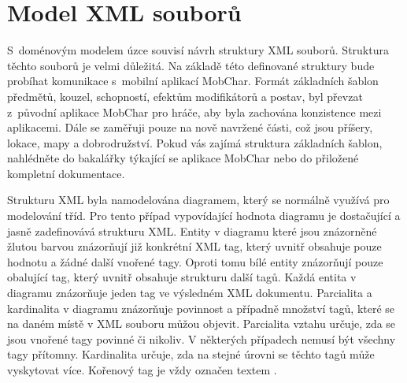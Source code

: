 \documentclass[thesis=B,czech]{resources/FITthesis}[2012/06/26]
\begin{document}
	\section{Model XML souborů}
S~doménovým modelem úzce souvisí návrh struktury XML souborů. Struktura těchto souborů je velmi důležitá. Na základě této definované struktury bude probíhat komunikace s~mobilní aplikací MobChar. Formát základních šablon předmětů, kouzel, schopností, efektům modifikátorů a postav, byl převzat z~původní aplikace MobChar pro hráče, aby byla zachována konzistence mezi aplikacemi. Dále se zaměřuji pouze na nově navržené části, což jsou příšery, lokace, mapy a dobrodružství. Pokud vás zajímá struktura základních šablon, nahlédněte do bakalářky týkající se aplikace MobChar\cite{Weberova_2017} nebo do přiložené kompletní dokumentace.\par

Strukturu XML byla namodelována diagramem, který se normálně využívá pro modelování tříd. Pro tento případ vypovídající hodnota diagramu je dostačující a jasně zadefinovává strukturu XML. Entity v diagramu které jsou znázorněné žlutou barvou znázorňují již konkrétní XML tag, který uvnitř obsahuje pouze hodnotu a žádné další vnořené tagy. Oproti tomu bílé entity znázorňují pouze obalující tag, který uvnitř obsahuje strukturu další tagů. Každá entita v diagramu znázorňuje jeden tag ve výsledném XML dokumentu. Parcialita a kardinalita v diagramu znázorňuje povinnost a případně množství tagů, které se na daném místě v XML souboru můžou objevit. Parcialita vztahu určuje, zda se jsou vnořené tagy povinné či nikoliv. V některých případech nemusí být všechny tagy přítomny. Kardinalita určuje, zda na stejné úrovni se těchto tagů může vyskytovat více. Kořenový tag je vždy označen textem   .
\end{document}
